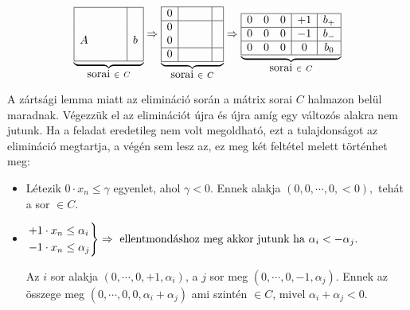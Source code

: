 \begin{displaymath}
	\underbrace{
		\begin{array}{|cccc|c|}
			\hline
			  &  &  &  &   \\
			  &  &  &  &   \\
			A &  &  &  & b \\
			  &  &  &  &   \\
			\hline
		\end{array}}_{\mbox{sorai } \in~C}
	\Rightarrow
	\underbrace{
		\begin{array}{|c|ccc|c|}
			\hline
			0 &  &  &  & \\
			\hline
			0 &  &  &  & \\
			0 &  &  &  & \\
			\hline
			0 &  &  &  & \\
			\hline
		\end{array}}_{\mbox{sorai } \in~C}
	\Rightarrow
	\underbrace{
		\begin{array}{|ccc|c|c|}
			\hline
			0 & 0 & 0 & +1 & b_+ \\
			\hline
			0 & 0 & 0 & -1 & b_- \\
			\hline
			0 & 0 & 0 & 0  & b_0 \\
			\hline
		\end{array}}_{\mbox{sorai } \in~C}
\end{displaymath}

A zártsági lemma miatt az elimináció során a mátrix sorai $C$ halmazon belül
maradnak. Végezzük el az eliminációt újra és újra amíg egy változós alakra nem
jutunk. Ha a feladat eredetileg nem volt megoldható, ezt a tulajdonságot az
elimináció megtartja, a végén sem lesz az, ez meg két feltétel melett történhet meg:

\begin{itemize}
	\item Létezik $0 \cdot x_n \leq \gamma$ egyenlet, ahol $\gamma < 0$. Ennek alakja
	      $(0,0, \cdots, 0, <0),$ tehát a sor $\in C$.
	\item $\begin{rcases}
			      +1 \cdot x_n \leq \alpha_i \\
			      -1 \cdot x_n \leq \alpha_j \\
		      \end{rcases} \Rightarrow  \mbox{ ellentmondáshoz meg akkor jutunk ha }
		      \alpha_i < -\alpha_j.$

	      Az $i$ sor alakja $(0, \cdots, 0, +1, \alpha_i)$, a $j$ sor meg $(0, \cdots,
		      0, -1, \alpha_j)$. Ennek az összege meg $(0, \cdots, 0, 0, \alpha_i+\alpha_j)$
	      ami szintén $\in C$, mivel $\alpha_i+\alpha_j<0$.
\end{itemize}

